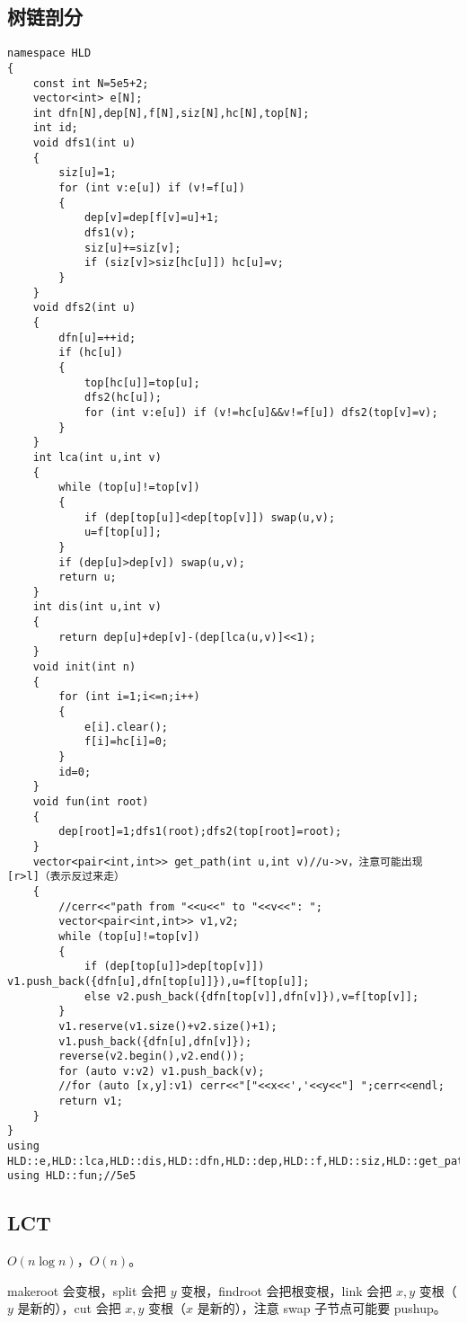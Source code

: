 \documentclass[12pt]{ctexart}
\begin{document}
\subsection{树链剖分}

\begin{lstlisting}
namespace HLD
{
	const int N=5e5+2;
	vector<int> e[N];
	int dfn[N],dep[N],f[N],siz[N],hc[N],top[N];
	int id;
	void dfs1(int u)
	{
		siz[u]=1;
		for (int v:e[u]) if (v!=f[u])
		{
			dep[v]=dep[f[v]=u]+1;
			dfs1(v);
			siz[u]+=siz[v];
			if (siz[v]>siz[hc[u]]) hc[u]=v;
		}
	}
	void dfs2(int u)
	{
		dfn[u]=++id;
		if (hc[u])
		{
			top[hc[u]]=top[u];
			dfs2(hc[u]);
			for (int v:e[u]) if (v!=hc[u]&&v!=f[u]) dfs2(top[v]=v);
		}
	}
	int lca(int u,int v)
	{
		while (top[u]!=top[v])
		{
			if (dep[top[u]]<dep[top[v]]) swap(u,v);
			u=f[top[u]];
		}
		if (dep[u]>dep[v]) swap(u,v);
		return u;
	}
	int dis(int u,int v)
	{
		return dep[u]+dep[v]-(dep[lca(u,v)]<<1);
	}
	void init(int n)
	{
		for (int i=1;i<=n;i++)
		{
			e[i].clear();
			f[i]=hc[i]=0;
		}
		id=0;
	}
	void fun(int root)
	{
		dep[root]=1;dfs1(root);dfs2(top[root]=root);
	}
	vector<pair<int,int>> get_path(int u,int v)//u->v，注意可能出现 [r>l]（表示反过来走）
	{
		//cerr<<"path from "<<u<<" to "<<v<<": ";
		vector<pair<int,int>> v1,v2;
		while (top[u]!=top[v])
		{
			if (dep[top[u]]>dep[top[v]]) v1.push_back({dfn[u],dfn[top[u]]}),u=f[top[u]];
			else v2.push_back({dfn[top[v]],dfn[v]}),v=f[top[v]];
		}
		v1.reserve(v1.size()+v2.size()+1);
		v1.push_back({dfn[u],dfn[v]});
		reverse(v2.begin(),v2.end());
		for (auto v:v2) v1.push_back(v);
		//for (auto [x,y]:v1) cerr<<"["<<x<<','<<y<<"] ";cerr<<endl;
		return v1;
	}
}
using HLD::e,HLD::lca,HLD::dis,HLD::dfn,HLD::dep,HLD::f,HLD::siz,HLD::get_path;
using HLD::fun;//5e5
\end{lstlisting}



\subsection{LCT}

$O(n\log n)$，$O(n)$。

makeroot 会变根，split 会把 $y$ 变根，findroot 会把根变根，link 会把 $x,y$ 变根（$y$ 是新的），cut 会把 $x,y$ 变根（$x$ 是新的），注意 swap 子节点可能要 pushup。
\end{document}

